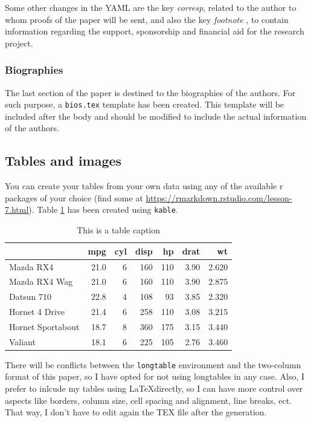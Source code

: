 \documentclass[]{latex/ieeeaccess}
\begin{document}
Some other changes in the YAML are the key \emph{corresp}, related to
the author to whom proofs of the paper will be sent, and also the key
\emph{footnote} , to contain information regarding the support,
sponsorship and financial aid for the research project.

\hypertarget{biographies}{%
\subsubsection{Biographies}\label{biographies}}

The last section of the paper is destined to the biographies of the
authors. For such purpose, a \texttt{bios.tex} template has been
created. This template will be included after the body and should be
modified to include the actual information of the authors.

\hypertarget{tables-and-images}{%
\subsection{Tables and images}\label{tables-and-images}}

You can create your tables from your own data using any of the available
r packages of your choice (find some at
\url{https://rmarkdown.rstudio.com/lesson-7.html}). Table
\ref{tab:rtable} has been created using \texttt{kable}.

\begin{table}[t]

\caption{\label{tab:rtable}This is a table caption}
\centering
\begin{tabular}{l|r|r|r|r|r|r}
\hline
  & mpg & cyl & disp & hp & drat & wt\\
\hline
Mazda RX4 & 21.0 & 6 & 160 & 110 & 3.90 & 2.620\\
\hline
Mazda RX4 Wag & 21.0 & 6 & 160 & 110 & 3.90 & 2.875\\
\hline
Datsun 710 & 22.8 & 4 & 108 & 93 & 3.85 & 2.320\\
\hline
Hornet 4 Drive & 21.4 & 6 & 258 & 110 & 3.08 & 3.215\\
\hline
Hornet Sportabout & 18.7 & 8 & 360 & 175 & 3.15 & 3.440\\
\hline
Valiant & 18.1 & 6 & 225 & 105 & 2.76 & 3.460\\
\hline
\end{tabular}
\end{table}

There will be conflicts between the \texttt{longtable} environment and
the two-column format of this paper, so I have opted for not using
longtables in any case. Also, I prefer to inlcude my tables using
\LaTeX  directly, so I can have more control over aspects like borders,
column size, cell spacing and alignment, line breaks, ect. That way, I
don't have to edit again the TEX file after the generation.
\end{document}
